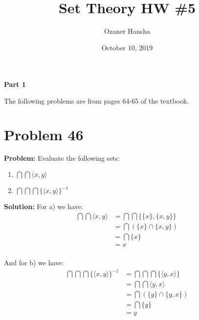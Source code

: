 \documentclass{article}
\begin{document}
\title{Set Theory HW \#5}
\author{Ozaner Hansha}
\date{October 10, 2019}
\maketitle

\newcommand{\pset}[1]{\mathfrak P#1}
\newcommand{\psetp}[1]{\mathfrak P(#1)}
\renewcommand{\wedge}{\,\,\&\,\,}
\renewcommand{\vee}{\text{ or }}
\newcommand{\pair}[2]{\langle#1,#2\rangle}
\newcommand{\triplet}[3]{\langle#1,#2,#3\rangle}
\renewcommand{\setminus}{-}


\begin{center}
    \Large{\textbf{Part 1}}
\end{center}

The following problems are from pages 64-65 of the textbook.

\section*{Problem 46}
\noindent\textbf{Problem:} Evaluate the following sets:

\begin{enumerate}[label=\alph*)]
    \item $\bigcap\bigcap\pair{x}{y}$
    \item $\bigcap\bigcap\bigcap\{\pair{x}{y}\}^{-1}$
\end{enumerate}
\medskip

\noindent\textbf{Solution:} For a) we have:
\begin{align*}
    \bigcap\bigcap\pair{x}{y}&=\bigcap\bigcap\{\{x\},\{x,y\}\}\tag{def. of ordered pair}\\
    &=\bigcap(\{x\}\cap\{x,y\})\tag{def. of arbitrary intersection}\\
    &=\bigcap\{x\}\\
    &=x\tag{def. of arbitrary intersection}\\
\end{align*}

And for b) we have:
\begin{align*}
    \bigcap\bigcap\bigcap\{\pair{x}{y}\}^{-1}&=\bigcap\bigcap\bigcap\{\pair{y}{x}\}\tag{def. of inverse}\\
    &=\bigcap\bigcap\pair{y}{x}\tag{def. of arbitrary intersection}\\
    &=\bigcap(\{y\}\cap\{y,x\})\tag{def. of arbitrary intersection}\\
    &=\bigcap\{y\}\\
    &=y\tag{def. of arbitrary intersection}\\
\end{align*}
\end{document}
